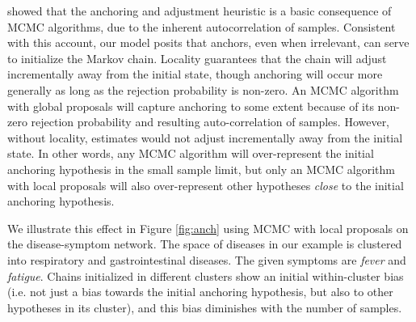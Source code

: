 \citet{Lieder2013} showed that the anchoring and adjustment heuristic is a basic consequence of MCMC algorithms, due to the inherent autocorrelation of samples. Consistent with this account, our model posits that anchors, even when irrelevant, can serve to initialize the Markov chain. Locality guarantees that the chain will adjust incrementally away from the initial state, though anchoring will occur more generally as long as the rejection probability is non-zero. An MCMC algorithm with global proposals will capture anchoring to some extent because of its non-zero rejection probability and resulting auto-correlation of samples. However, without locality, estimates would not adjust incrementally away from the initial state. In other words, any MCMC algorithm will over-represent the initial anchoring hypothesis in the small sample limit, but only an MCMC algorithm with local proposals will also over-represent other hypotheses \textit{close} to the initial anchoring hypothesis.

We illustrate this effect in Figure \ref{fig:anch} using MCMC with local proposals on the disease-symptom network. The space of diseases in our example is clustered into respiratory and gastrointestinal diseases. The given symptoms are \textit{fever} and \textit{fatigue}. Chains initialized in different clusters show an initial within-cluster bias (i.e. not just a bias towards the initial anchoring hypothesis, but also to other hypotheses in its cluster), and this bias diminishes with the number of samples.

